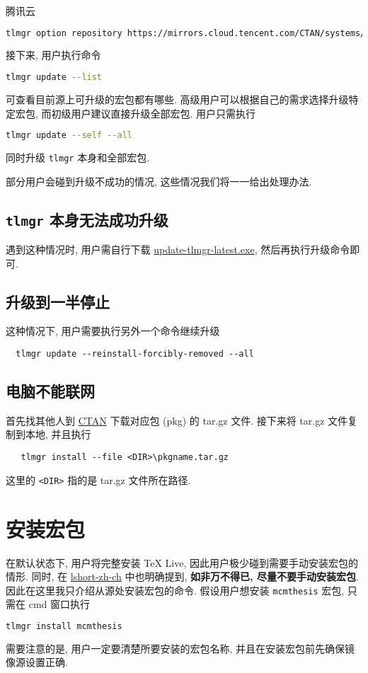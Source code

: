 \documentclass{ctexrep}
\begin{document}
腾讯云
\begin{lstlisting}[language=bash]
  tlmgr option repository https://mirrors.cloud.tencent.com/CTAN/systems/texlive/tlnet
\end{lstlisting}
接下来, 用户执行命令
\begin{lstlisting}[language=bash]
  tlmgr update --list
\end{lstlisting}
可查看目前源上可升级的宏包都有哪些. 
高级用户可以根据自己的需求选择升级特定宏包, 而初级用户建议直接升级全部宏包. 
用户只需执行
\begin{lstlisting}[language=bash]
  tlmgr update --self --all
\end{lstlisting}
同时升级 \texttt{tlmgr} 本身和全部宏包. 

部分用户会碰到升级不成功的情况, 这些情况我们将一一给出处理办法. 

\subsection{\texttt{tlmgr} 本身无法成功升级}

遇到这种情况时, 用户需自行下载 \href{http://mirror.ctan.org/systems/texlive/tlnet/update-tlmgr-latest.exe}{update-tlmgr-latest.exe}, 然后再执行升级命令即可. 

\subsection{升级到一半停止}

这种情况下, 用户需要执行另外一个命令继续升级
\begin{lstlisting}
  tlmgr update --reinstall-forcibly-removed --all
\end{lstlisting}

\subsection{电脑不能联网}
首先找其他人到 \href{https://ctan.org/pkg}{CTAN} 下载对应包 (pkg) 的 tar.gz 文件.
接下来将 tar.gz 文件复制到本地, 并且执行
\begin{lstlisting}
   tlmgr install --file <DIR>\pkgname.tar.gz
\end{lstlisting}
这里的 \texttt{<DIR>} 指的是 tar.gz 文件所在路径.

\section{安装宏包}
在默认状态下, 用户将完整安装 \TeX{} Live, 因此用户极少碰到需要手动安装宏包的情形. 
同时, 在 \href{http://mirrors.ctan.org/info/lshort/chinese/lshort-zh-cn.pdf}{lshort-zh-ch} 中也明确提到, \textbf{如非万不得已, 尽量不要手动安装宏包}. 
因此在这里我只介绍从源处安装宏包的命令. 
假设用户想安装 \texttt{mcmthesis} 宏包, 只需在 \textsf{cmd} 窗口执行
\begin{lstlisting}[language=bash]
  tlmgr install mcmthesis
\end{lstlisting}
需要注意的是, 用户一定要清楚所要安装的宏包名称, 并且在安装宏包前先确保镜像源设置正确. 
\end{document}
